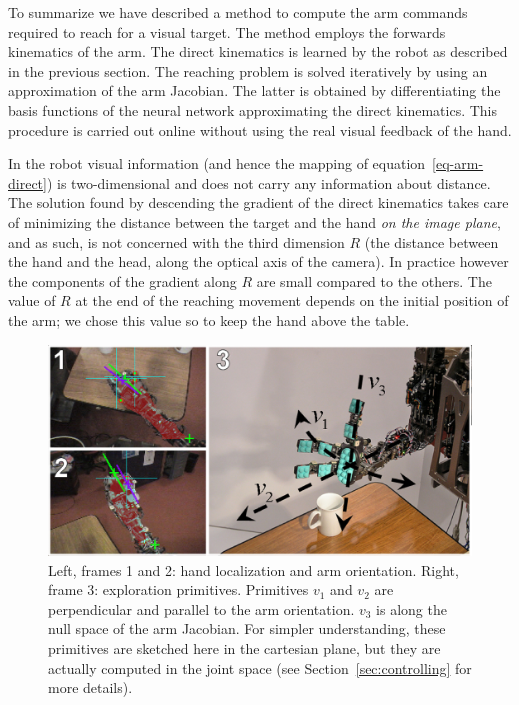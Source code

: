 To summarize we have described a method to compute the arm
commands required to reach for a visual target. The method employs
the forwards kinematics of the arm. The direct kinematics is
learned by the robot as described in the previous section. The
reaching problem is solved iteratively by using an approximation
of the arm Jacobian. The latter is obtained by differentiating the
basis functions of the neural network approximating the direct
kinematics. This procedure is carried out online without using the
real visual feedback of the hand.

In the robot visual information (and hence the mapping of 
equation~\ref{eq-arm-direct})
is two-dimensional and does not carry any information
about distance. The solution found by descending the gradient of the
direct kinematics takes care of minimizing the distance between the target
and the hand \emph{on the image plane}, and as such, is not concerned
with the third dimension $R$ (the distance between the hand and the head, 
along the optical axis of the camera).
In practice however the components of the gradient along $R$ are small
compared to the others. The value of $R$ at the end of the reaching movement
depends on the initial position of the arm; we chose this value so to keep
the hand above the table.
%
\begin{figure}[tb]
  \centerline{
    \includegraphics[width=\columnwidth, angle=0 ]{./figures/expl-directions.eps}
  }\caption{Left, frames 1 and 2: hand localization and arm
    orientation. Right, frame 3: exploration primitives. Primitives $v_1$
and $v_2$ are perpendicular and parallel to the arm orientation.
$v_3$ is along the null space of the arm Jacobian. For simpler understanding, 
these primitives are sketched here in the cartesian plane, but 
they are actually computed in the joint space (see 
Section~\ref{sec:controlling} for more details).}
\label{fig:expl-directions}
\end{figure}
%
